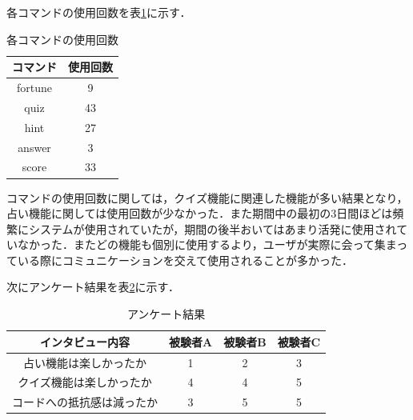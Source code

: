 各コマンドの使用回数を表\ref{command}に示す．

\begin{table}[!ht]
  \centering
  \caption{各コマンドの使用回数}
  \label{command}
    \begin{tabular}{|c|c|} \hline
      コマンド & 使用回数 \\ \hline \hline
      fortune & 9 \\ \hline
      quiz & 43 \\ \hline
      hint & 27 \\ \hline
      answer & 3 \\ \hline
      score & 33 \\ \hline
    \end{tabular}
\end{table}

コマンドの使用回数に関しては，クイズ機能に関連した機能が多い結果となり，占い機能に関しては使用回数が少なかった．また期間中の最初の3日間ほどは頻繁にシステムが使用されていたが，期間の後半おいてはあまり活発に使用されていなかった．またどの機能も個別に使用するより，ユーザが実際に会って集まっている際にコミュニケーションを交えて使用されることが多かった．

次にアンケート結果を表\ref{interview}に示す．
\begin{table}[!ht]
  \centering
  \caption{アンケート結果}
  \label{interview}
    \begin{tabular}{|c|c|c|c|} \hline
      インタビュー内容 & 被験者A & 被験者B & 被験者C \\ \hline \hline
      占い機能は楽しかったか & 1 & 2 & 3 \\ \hline
      クイズ機能は楽しかったか & 4 & 4 & 5 \\ \hline
      コードへの抵抗感は減ったか & 3 & 5 &5 \\ \hline
    \end{tabular}
\end{table}

